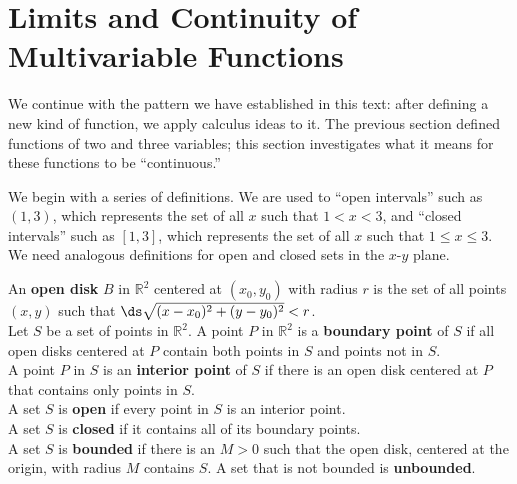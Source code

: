 \section{Limits and Continuity of Multivariable Functions}\label{sec:multi_limit}

We continue with the pattern we have established in this text: after defining a new kind of function, we apply calculus ideas to it. The previous section defined functions of two and three variables; this section investigates what it means for these functions to be ``continuous.''

We begin with a series of definitions. We are used to ``open intervals'' such as $(1,3)$, which represents the set of all $x$ such that $1<x<3$,  and ``closed intervals'' such as $[1,3]$, which represents the set of all $x$ such that $1\leq x\leq 3$. We need analogous definitions for open and closed sets in the $x$-$y$ plane.

{An \textbf{open disk} $B$ in $\mathbb{R}^2$ centered at $(x_0,y_0)$ with radius $r$ is the set of all points $(x,y)$ such that $\ds\sqrt{(x-x_0)^2+(y-y_0)^2} < r$. \\

Let $S$ be a set of points in $\mathbb{R}^2$. A point $P$ in $\mathbb{R}^2$ is a \textbf{boundary point} of $S$  if all open disks centered at $P$ contain both points in $S$ and points not in $S$.\\

A point $P$ in $S$ is an \textbf{interior point} of $S$ if there is an open disk centered at $P$ that contains only points in $S$. \\

A set $S$ is \textbf{open} if every point in $S$ is an interior point.\\

A set $S$ is \textbf{closed} if it contains all of its boundary points.\\

A set $S$ is \textbf{bounded} if there is an $M>0$ such that the open disk, centered at the origin, with radius $M$ contains $S$. A set that is not bounded is \textbf{unbounded}.
}

